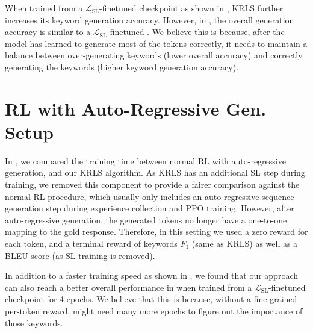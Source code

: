 When trained from a $\mathcal{L}_{\mathrm{SL}}$-finetuned checkpoint as shown in , KRLS further increases its keyword generation accuracy. However, in , the overall generation accuracy is similar to a $\mathcal{L}_{\mathrm{SL}}$-finetuned . We believe this is because, after the model has learned to generate most of the tokens correctly, it needs to maintain a balance between over-generating keywords (lower overall accuracy) and correctly generating the keywords (higher keyword generation accuracy).

\section{RL with Auto-Regressive Gen. Setup}
\label{sec:RL with Auto-Regressive Gen. Setup}
In , we compared the training time between normal RL with auto-regressive generation, and our KRLS algorithm. As KRLS has an additional SL step during training, we removed this component to provide a fairer comparison against the normal RL procedure, which usually only includes an auto-regressive sequence generation step during experience collection and PPO training. However, after auto-regressive generation, the generated tokens no longer have a one-to-one mapping to the gold response. Therefore, in this setting we used a zero reward for each token, and a terminal reward of keywords $F_1$ (same as KRLS) as well as a BLEU score (as SL training is removed).

In addition to a faster training speed as shown in , we found that our approach can also reach a better overall performance in  when trained from a $\mathcal{L}_{\mathrm{SL}}$-finetuned checkpoint for 4 epochs. We believe that this is because, without a fine-grained per-token reward,  might need many more epochs to figure out the importance of those keywords.
\begin{table}[h]
  \centering
  \caption{Test performance when trained from a $\mathcal{L}_{\mathrm{SL}}$-finetuned checkpoint for 4 epochs.  refers to removing the SL step in KRLS, and replacing sequence ``sampling'' step with auto-regressive generation.}
  \label{tbl:normal_rl_vs_krls}
\end{table}
